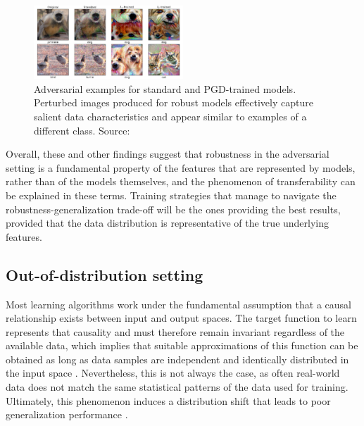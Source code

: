 \begin{figure}[H]
    \centering
    \includegraphics[width=0.5\textwidth]{img/introduction/adversarial_salient.png}
    \caption{Adversarial examples for standard and PGD-trained models.
    Perturbed images produced for robust models 
    effectively capture salient data characteristics and 
    appear similar to examples of a different class. 
    Source: \cite{tsiprasRobustnessMayBe2019}}
    \label{fig:salient_characteristics}
\end{figure}

Overall, these and other findings suggest that robustness in the adversarial setting
is a fundamental property of the features that are represented by models, 
rather than of the models themselves, and the phenomenon of transferability can be
explained in these terms. Training strategies that manage to navigate the 
robustness-generalization trade-off will be the ones providing 
the best results, provided that the data distribution
is representative of the true underlying features. \\

\subsection{Out-of-distribution setting}\label{sec:intro_ood}

Most learning algorithms work under the fundamental assumption that
a causal relationship exists between input and output spaces. The target function to 
learn represents that causality and must therefore remain 
invariant regardless of the available data, which implies that 
suitable approximations of this 
function can be obtained as long as data samples are independent 
and identically distributed in the input space
\cite{muandetDomainGeneralizationInvariant2013,quinonero-candelaDatasetShiftMachine2009}. 
Nevertheless, this is not always
the case, as often real-world data does not match the same statistical
patterns of the data used for training. Ultimately, this phenomenon induces a
distribution shift that leads to poor generalization performance
\cite{zhouDomainGeneralizationSurvey2022,wangGeneralizingUnseenDomains2022,liuOutOfDistributionGeneralizationSurvey2023}. \\

